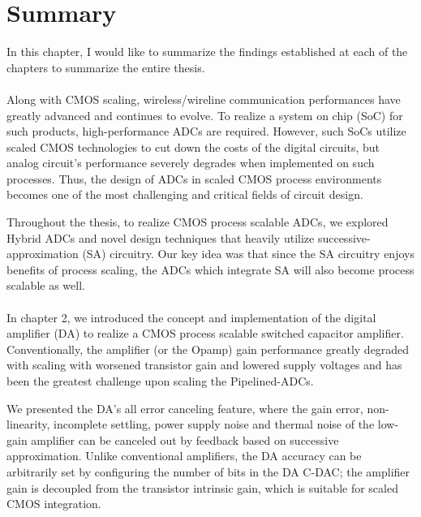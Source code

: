 
\section{Summary}
In this chapter, I would like to summarize the findings established at each of the chapters to summarize the entire thesis.
\\
\\
Along with CMOS scaling, wireless/wireline communication performances have greatly advanced and continues to evolve.
To realize a system on chip (SoC) for such products, high-performance ADCs are required.  
However, such SoCs utilize scaled CMOS technologies to cut down the costs of the digital circuits, but analog circuit's performance severely degrades when implemented on such processes. 
Thus, the design of ADCs in scaled CMOS process environments becomes one of the most challenging and critical fields of circuit design.

Throughout the thesis, to realize CMOS process scalable ADCs, we explored Hybrid ADCs and novel design techniques that heavily utilize successive-approximation (SA) circuitry. Our key idea was that since the SA circuitry enjoys benefits of process scaling, the ADCs which integrate SA will also become process scalable as well.
\\
\\
In chapter 2, we introduced the concept and implementation of the digital amplifier (DA) to realize a CMOS process scalable switched capacitor amplifier.
Conventionally, the amplifier (or the Opamp) gain performance greatly degraded with scaling with worsened transistor gain and lowered supply voltages and has been the greatest challenge upon scaling the Pipelined-ADCs.

We presented the DA's all error canceling feature, where the gain error, non-linearity, incomplete settling, power supply noise and thermal noise of the low-gain amplifier can be canceled out by feedback based on successive approximation. Unlike conventional amplifiers, the DA accuracy can be arbitrarily set by configuring the number of bits in the DA C-DAC; the amplifier gain is decoupled from the transistor intrinsic gain, which is suitable for scaled CMOS integration.

